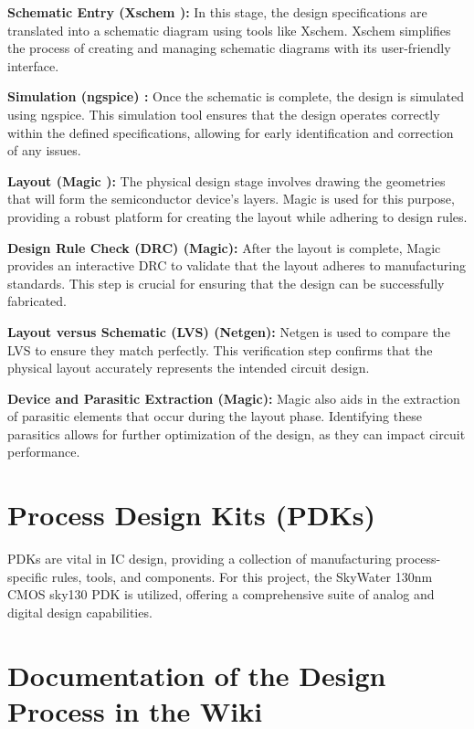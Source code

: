 \textbf{Schematic Entry (Xschem \parencite{xschem}):}
In this stage, the design specifications are translated into a schematic diagram using tools like Xschem. Xschem simplifies the process of creating and managing schematic diagrams with its user-friendly interface.

\textbf{Simulation (ngspice) \parencite{ngspice}:}
Once the schematic is complete, the design is simulated using ngspice. This simulation tool ensures that the design operates correctly within the defined specifications, allowing for early identification and correction of any issues.

\textbf{Layout (Magic \parencite{magic}):}
The physical design stage involves drawing the geometries that will form the semiconductor device's layers. Magic is used for this purpose, providing a robust platform for creating the layout while adhering to design rules.

\textbf{Design Rule Check (DRC) (Magic):}
After the layout is complete, Magic provides an interactive DRC to validate that the layout adheres to manufacturing standards. This step is crucial for ensuring that the design can be successfully fabricated.

\textbf{Layout versus Schematic (LVS) (Netgen):}
Netgen is used to compare the LVS to ensure they match perfectly. This verification step confirms that the physical layout accurately represents the intended circuit design.

\textbf{Device and Parasitic Extraction (Magic):}
Magic also aids in the extraction of parasitic elements that occur during the layout phase. Identifying these parasitics allows for further optimization of the design, as they can impact circuit performance.

\section{Process Design Kits (PDKs)}

PDKs are vital in IC design, providing a collection of manufacturing process-specific rules, tools, and components. For this project, the SkyWater 130nm CMOS sky130 PDK \parencite{SkyWater_Technology_US_Semiconductor_Manufacturer} is utilized, offering a comprehensive suite of analog and digital design capabilities.

\section{Documentation of the Design Process in the Wiki \cite{ethz_bsse_wiki}}

